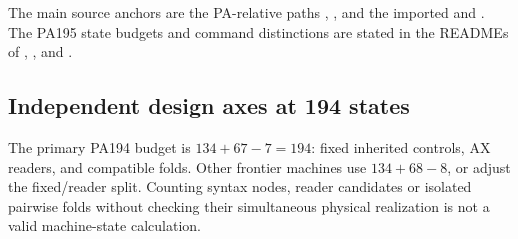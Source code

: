 The main source anchors are the PA-relative paths
,
, and the imported
 and .
The PA195 state budgets and command distinctions are stated in the READMEs of
,
, and
.

\subsection{Independent design axes at 194 states}

The primary PA194 budget is $134+67-7=194$: fixed inherited controls, AX readers,
and compatible folds. Other frontier machines use $134+68-8$, or adjust the
fixed/reader split. Counting syntax nodes, reader candidates or isolated
pairwise folds without checking their simultaneous physical realization is
not a valid machine-state calculation.

